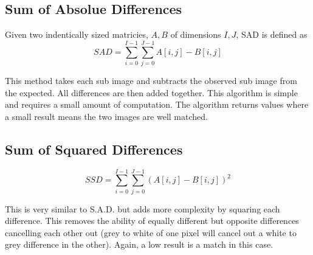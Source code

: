 \subsection{Sum of Absolue Differences}

Given two indentically sized matricies, $A, B$ of dimensions $I,J$, SAD is defined as
\begin{equation} \label{eq:SAD}
SAD = \sum\limits_{i=0}^{I-1} \sum\limits_{j=0}^{J-1} A[i,j] - B[i,j] 
\end{equation}

This method takes each sub image and subtracts the observed sub image from the expected. All differences are then added together. This algorithm is simple and requires a small amount of computation. The algorithm returns values where a small result means the two images are well matched.

\subsection{Sum of Squared Differences}
\begin{equation}\label{eq:SSD}
SSD = \sum\limits_{i=0}^{I-1} \sum\limits_{j=0}^{J-1} (A[i,j] - B[i,j] )^2
\end{equation}

This is very similar to S.A.D. but adds more complexity by squaring each difference. This removes the ability of equally different but opposite differences cancelling each other out (grey to white of one pixel will cancel out a white to grey difference in the other). Again, a low result is a match in this case.

%


